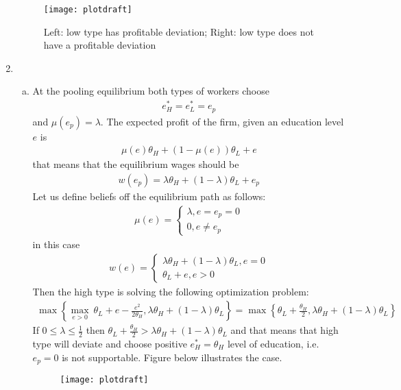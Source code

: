 \documentclass[a4paper]{article}
\begin{document}
\begin{enumerate}
	\begin{figure}[H]
		\centering
		\texttt{[image: plotdraft]}
		\caption{Left: low type has profitable deviation; Right: low type does not have a profitable deviation}\label{fig7}
	\end{figure}
	\item 
	\begin{enumerate}[(a)]
	\item At the pooling equilibrium both types of workers choose
	\begin{align*}
	e^*_H = e^*_L = e_p
	\end{align*}
	and $\mu(e_p) = \lambda$. The expected profit of the firm, given an education level $e$ is
	\begin{align*}
	\mu(e) \theta_H + (1 - \mu(e)) \theta_L + e
	\end{align*}
	that means that the equilibrium wages should be
	\begin{align*}
	w(e_p) =  \lambda \theta_H + (1 - \lambda) \theta_L + e_p
	\end{align*} 
	Let us define beliefs off the equilibrium path as follows:
	\begin{align*}
	\mu(e) = \begin{cases}
	\lambda, e=e_p = 0\\
	0, e \neq e_p
	\end{cases}
	\end{align*}
	in this case
	\begin{align*}
	w(e) = \begin{cases}
	\lambda \theta_H + (1 - \lambda) \theta_L, e = 0\\
	\theta_L + e, e > 0
	\end{cases}
	\end{align*}
	Then the high type is solving the following optimization problem:
	\begin{align*}
	\max\left\{ \underset{e > 0}{\max}\ \theta_L + e - \frac{e^2}{2\theta_H}, \lambda \theta_H + (1 - \lambda) \theta_L \right\} = \max\left\{\theta_L + \frac{\theta_H}{2}, \lambda \theta_H + (1 - \lambda) \theta_L \right\}
	\end{align*}
	If $0 \le \lambda \le \frac{1}{2}$ then $\theta_L + \frac{\theta_H}{2} > \lambda \theta_H + (1 - \lambda)\theta_L$ and that means that high type will deviate and choose positive $e^*_H = \theta_H$ level of education, i.e. $e_p = 0$ is not supportable. Figure below illustrates the case.
	\begin{figure}[H]
		\centering
		\texttt{[image: plotdraft]}

\end{figure}
\end{enumerate}
\end{enumerate}
\end{document}
